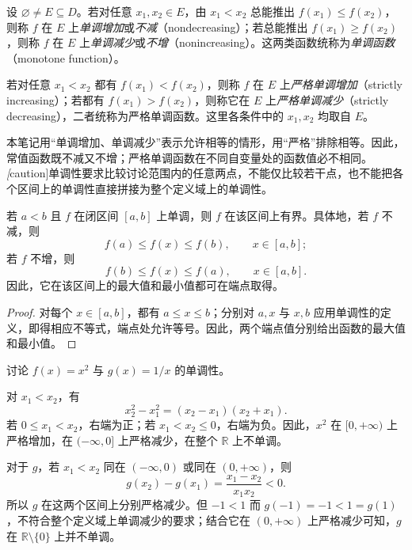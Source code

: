 \begin{definition}
\label{def:monotone-functions}
设 $\varnothing\neq E\subseteq D$。若对任意 $x_1,x_2\in E$，由 $x_1<x_2$ 总能推出 $f(x_1)\leq f(x_2)$，则称 $f$ 在 $E$ 上\emph{单调增加}或\emph{不减}（nondecreasing）；若总能推出 $f(x_1)\geq f(x_2)$，则称 $f$ 在 $E$ 上\emph{单调减少}或\emph{不增}（nonincreasing）。这两类函数统称为\emph{单调函数}（monotone function）。

若对任意 $x_1<x_2$ 都有 $f(x_1)<f(x_2)$，则称 $f$ 在 $E$ 上\emph{严格单调增加}（strictly increasing）；若都有 $f(x_1)>f(x_2)$，则称它在 $E$ 上\emph{严格单调减少}（strictly decreasing），二者统称为严格单调函数。这里各条件中的 $x_1,x_2$ 均取自 $E$。
\end{definition}

本笔记用“单调增加、单调减少”表示允许相等的情形，用“严格”排除相等。因此，常值函数既不减又不增；严格单调函数在不同自变量处的函数值必不相同。\emph[caution]{单调性要求比较讨论范围内的任意两点，不能仅比较若干点，也不能把各个区间上的单调性直接拼接为整个定义域上的单调性。}

\begin{proposition}
\label{prop:monotone-function-endpoint-bounds}
若 $a<b$ 且 $f$ 在闭区间 $[a,b]$ 上单调，则 $f$ 在该区间上有界。具体地，若 $f$ 不减，则
\[
    f(a)\leq f(x)\leq f(b),\qquad x\in[a,b];
\]
若 $f$ 不增，则
\[
    f(b)\leq f(x)\leq f(a),\qquad x\in[a,b].
\]
因此，它在该区间上的最大值和最小值都可在端点取得。
\end{proposition}

\begin{proof}
对每个 $x\in[a,b]$，都有 $a\leq x\leq b$；分别对 $a,x$ 与 $x,b$ 应用单调性的定义，即得相应不等式，端点处允许等号。因此，两个端点值分别给出函数的最大值和最小值。
\end{proof}

\begin{example}
\label{ex:monotonicity-on-subsets}
讨论 $f(x)=x^2$ 与 $g(x)=1/x$ 的单调性。
\end{example}

\begin{solve}
对 $x_1<x_2$，有
\[
    x_2^2-x_1^2=(x_2-x_1)(x_2+x_1).
\]
若 $0\leq x_1<x_2$，右端为正；若 $x_1<x_2\leq 0$，右端为负。因此，$x^2$ 在 $[0,+\infty)$ 上严格增加，在 $(-\infty,0]$ 上严格减少，在整个 $\mathbb{R}$ 上不单调。

对于 $g$，若 $x_1<x_2$ 同在 $(-\infty,0)$ 或同在 $(0,+\infty)$，则
\[
    g(x_2)-g(x_1)=\frac{x_1-x_2}{x_1x_2}<0.
\]
所以 $g$ 在这两个区间上分别严格减少。但 $-1<1$ 而 $g(-1)=-1<1=g(1)$，不符合整个定义域上单调减少的要求；结合它在 $(0,+\infty)$ 上严格减少可知，$g$ 在 $\mathbb{R}\setminus\{0\}$ 上并不单调。
\end{solve}

